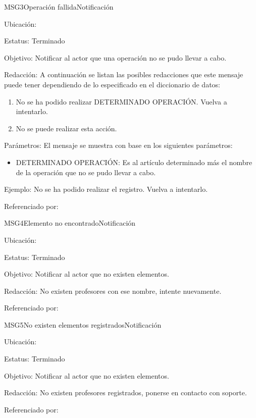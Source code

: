 \begin{mensaje}{MSG3}{Operación fallida}{Notificación}
	\item[Ubicación:] \msjEmergente
	\item[Estatus:] Terminado
	\item[Objetivo:] Notificar al actor que una operación no se pudo llevar a cabo.
	\item[Redacción:] A continuación se listan las posibles redacciones que este mensaje puede tener dependiendo de lo especificado en el diccionario de datos:
	\begin{enumerate}
		\item No se ha podido realizar DETERMINADO OPERACIÓN. Vuelva a intentarlo.
		\item No se puede realizar esta acción.
	\end{enumerate}

	\item[Parámetros:] El mensaje se muestra con base en los siguientes parámetros:
	\begin{itemize}
		\item DETERMINADO OPERACIÓN: Es al artículo determinado más el nombre de la operación que no se pudo llevar a cabo.
	\end{itemize}
	\item[Ejemplo:] No se ha podido realizar el registro. Vuelva a intentarlo.
	\item[Referenciado por:] 
\end{mensaje}


\begin{mensaje}{MSG4}{Elemento no encontrado}{Notificación}
	\item[Ubicación:] \msjEmergente
	\item[Estatus:] Terminado
	\item[Objetivo:] Notificar al actor que no existen elementos.
	\item[Redacción:] No existen profesores con ese nombre, intente nuevamente.
	\item[Referenciado por:] 
\end{mensaje}

\begin{mensaje}{MSG5}{No existen elementos registrados}{Notificación}
	\item[Ubicación:] \msjEmergente
	\item[Estatus:] Terminado
	\item[Objetivo:] Notificar al actor que no existen elementos.
	\item[Redacción:] No existen profesores registrados, ponerse en contacto con soporte.
	\item[Referenciado por:] 
\end{mensaje}

